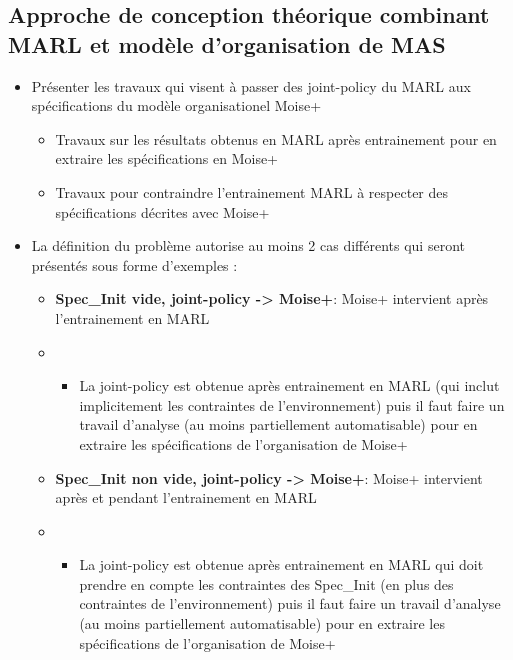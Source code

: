\documentclass[runningheads]{llncs}
\begin{document}
\subsection{Approche de conception théorique combinant MARL et modèle d'organisation de MAS}

\begin{itemize}

    \item Présenter les travaux qui visent à passer des joint-policy du MARL aux spécifications du modèle organisationel Moise+
          \begin{itemize}

              \item Travaux sur les résultats obtenus en MARL après entrainement pour en extraire les spécifications en Moise+
              \item Travaux pour contraindre l'entrainement MARL à respecter des spécifications décrites avec Moise+
          \end{itemize}
    \item La définition du problème autorise au moins 2 cas différents qui seront présentés sous forme d'exemples :
          \begin{itemize}
              \item \textbf{Spec\_Init vide, joint-policy -> Moise+}: Moise+ intervient après l'entrainement en MARL
              \item \begin{itemize}
                        \item La joint-policy est obtenue après entrainement en MARL (qui inclut implicitement les contraintes de l'environnement) puis il faut faire un travail d'analyse (au moins partiellement automatisable) pour en extraire les spécifications de l'organisation de Moise+
                    \end{itemize}
              \item \textbf{Spec\_Init non vide, joint-policy -> Moise+}: Moise+ intervient après et pendant l'entrainement en MARL
              \item \begin{itemize}
                        \item La joint-policy est obtenue après entrainement en MARL qui doit prendre en compte les contraintes des Spec\_Init (en plus des contraintes de l'environnement) puis il faut faire un travail d'analyse (au moins partiellement automatisable) pour en extraire les spécifications de l'organisation de Moise+

\end{itemize}
\end{itemize}
\end{itemize}
\end{document}
